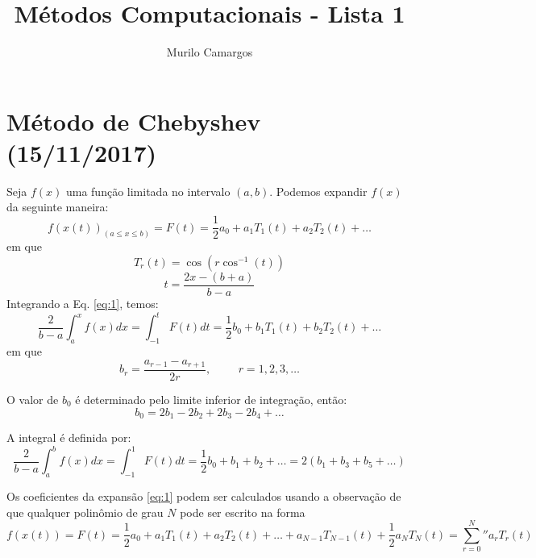 \documentclass[10pt,a4paper]{article}
\author{Murilo Camargos}
\title{Métodos Computacionais - Lista 1}
\begin{document}


	\section{Método de Chebyshev (15/11/2017)}
	Seja $f(x)$ uma função limitada no intervalo $(a,b)$. Podemos expandir $f(x)$ da seguinte maneira:
	\begin{equation}
		f(x(t))_{(a\leq x\leq b)} = F(t) = \frac{1}{2}a_0 + a_1T_1(t) + a_2T_2(t) + \dots
		\label{eq:1}
	\end{equation}
	em que
	\[T_r(t) = \cos{\left(r \cos^{-1}{(t)}\right)}\]
	\[t = \frac{2x - (b+a)}{b-a}\]
	Integrando a Eq. \ref{eq:1}, temos:
	\begin{equation}
		\frac{2}{b-a}\int_a^xf(x)dx = \int_{-1}^tF(t)dt = \frac{1}{2}b_0+b_1T_1(t)+b_2T_2(t)+\dots
		\label{eq:2}
	\end{equation}
	em que
	\[b_r = \frac{a_{r-1}-a_{r+1}}{2r}, \hspace{1cm} r=1,2,3,\dots\]
	
	O valor de $b_0$ é determinado pelo limite inferior de integração, então:
	\[b_0 = 2b_1 - 2b_2 + 2b_3 - 2b_4 + \dots\]
	
	A integral é definida por:
	\begin{equation}
		\frac{2}{b-a}\int_a^bf(x)dx = \int_{-1}^1F(t)dt = \frac{1}{2}b_0+b_1+b_2+\dots = 2\left(b_1+b_3+b_5+\dots\right)
		\label{eq:3}
	\end{equation}
	
	Os coeficientes da expansão \ref{eq:1} podem ser calculados usando a observação de que qualquer polinômio de grau $N$ pode ser escrito na forma
	\begin{equation}
		f(x(t)) = F(t) = \frac{1}{2}a_0+a_1T_1(t)+a_2T_2(t)+\dots+a_{N-1}T_{N-1}(t)+\frac{1}{2}a_NT_N(t) = {\sum_{r=0}^N}'' a_rT_r(t)
		\label{eq:4}
	\end{equation}
	
\end{document}
